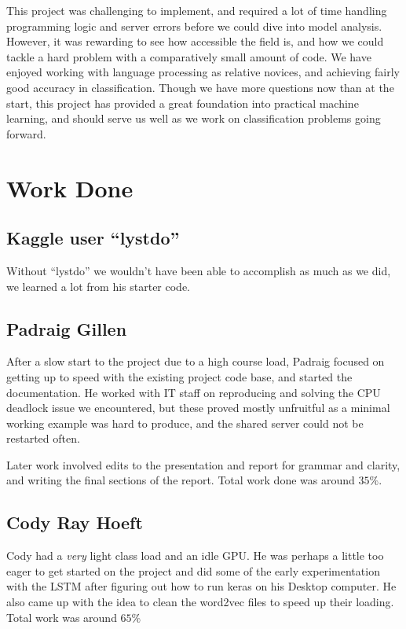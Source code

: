 \documentclass{article}
\begin{document}
This project was challenging to implement, and required a lot of time handling programming logic and server errors before we could dive into model analysis. However, it was rewarding to see how accessible the field is, and how we could tackle a hard problem with a comparatively small amount of code. We have enjoyed working with language processing as relative novices, and achieving fairly good accuracy in classification. Though we have more questions now than at the start, this project has provided a great foundation into practical machine learning, and should serve us well as we work on classification problems going forward. 




\clearpage
\appendix
\section{Work Done}
\subsection{Kaggle user ``lystdo''}
Without ``lystdo'' we wouldn't have been able to accomplish as much as we did, we learned a lot from his starter code.

\subsection{Padraig Gillen}
After a slow start to the project due to a high course load, Padraig focused on getting up to speed with the existing project code base, and started the documentation. He worked with IT staff on reproducing and solving the CPU deadlock issue we encountered, but these proved mostly unfruitful as a minimal working example was hard to produce, and the shared server could not be restarted often.

Later work involved edits to the presentation and report for grammar and clarity, and writing the final sections of the report. Total work done was around $35\%$.

\subsection{Cody Ray Hoeft}
Cody had a \textit{very} light class load and an idle GPU. He was perhaps a little too eager to get started on the project and did some of the early experimentation with the LSTM after figuring out how to run keras on his Desktop computer. He also came up with the idea to clean the word2vec files to speed up their loading. Total work was around $65\%$
\end{document}
